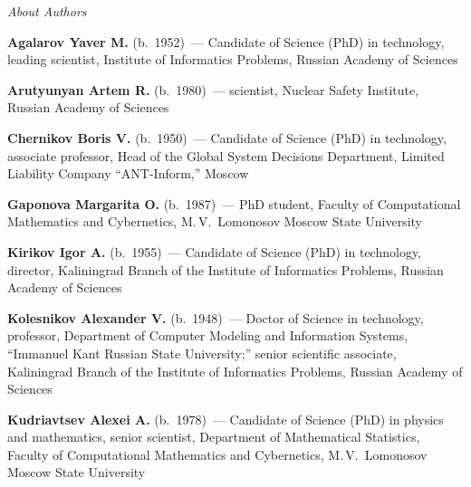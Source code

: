 \begin{center}\LARGE
\textit{About Authors}
\end{center}
\thispagestyle{empty}

\vspace*{24pt}

\begin{multicols}{2}


\noindent
\textbf{Agalarov Yaver M.} (b.\ 1952)~--- Candidate of Science (PhD) in technology, 
leading scientist, Institute of Informatics
Problems, Russian Academy of Sciences

\vspace*{6pt}

\noindent
\textbf{Arutyunyan Artem R.} (b.\ 1980)~--- scientist, Nuclear Safety Institute, Russian Academy of Sciences


\vspace*{6pt}

\noindent
\textbf{Chernikov Boris V.} (b.\ 1950)~--- Candidate of Science (PhD) in technology, associate professor,
Head of the Global System Decisions Department,
Limited Liability Company ``ANT-Inform,'' Moscow



\vspace*{6pt}

\noindent
\textbf{Gaponova Margarita O.} (b.\ 1987)~--- PhD student,
Faculty of Computational Mathematics
and Cybernetics, M.\,V.~Lomonosov Moscow State University

\vspace*{6pt}

\noindent
\textbf{Kirikov Igor A.} (b.\ 1955)~--- Candidate of Science (PhD) in technology, director, 
Kaliningrad Branch of the Institute of Informatics Problems, Russian Academy of Sciences

\vspace*{6pt}

\noindent
\textbf{Kolesnikov Alexander V.} (b.\ 1948)~--- Doctor of Science in technology, professor, 
Department of Computer Modeling and Information Systems, ``Immanuel Kant Russian State University;'' 
senior scientific associate, Kaliningrad Branch of the Institute of Informatics Problems, Russian Academy of Sciences

\vspace*{6pt}


\noindent  %
\textbf{Kudriavtsev Alexei A.} (b.\ 1978)~---  Candidate of Science (PhD) in physics
and mathematics, senior scientist, Department of Mathematical Statistics, Faculty of
Computational Mathematics and Cybernetics, M.\,V.~Lomonosov Moscow State University


\end{multicols}
